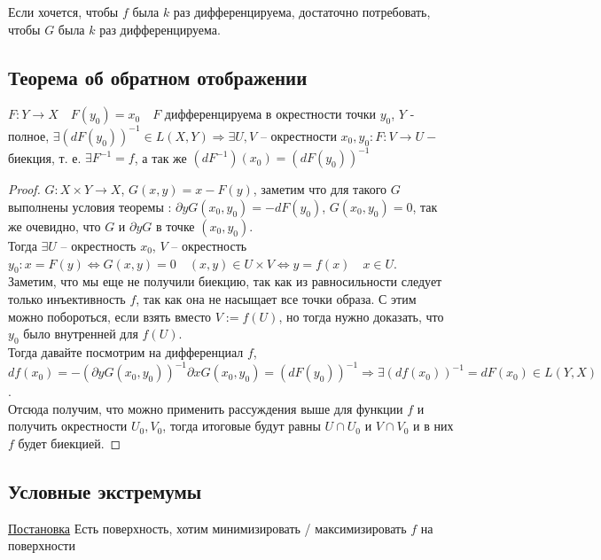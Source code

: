 \follow Если хочется, чтобы $f$ была $k$ раз дифференцируема, достаточно потребовать, чтобы $G$ была $k$ раз дифференцируема.

\subsection{Теорема об обратном отображении}
\begin{theorem}
    $F \colon Y \to X \quad F(y_0) = x_0 \quad F$ дифференцируема в окрестности точки $y_0$, $Y$ - полное, $\exists (d F(y_0))^{-1} \in L(X, Y) \Rightarrow \exists U, V$ -- окрестности $x_0, y_0 \colon F \colon V \to U -$ биекция, т. е. $\exists F^{-1} = f$, а так же $(dF^{-1})(x_0) = (d F(y_0))^{-1}$
\end{theorem}
\begin{proof}
    $G \colon X \times Y \to X$, $G(x, y) = x - F(y)$, заметим что для такого $G$ выполнены условия теоремы : $\partial y G(x_0, y_0) = -d F(y_0)$, $G(x_0, y_0) = 0$, так же очевидно, что $G$ и $\partial y G$ в точке $(x_0, y_0)$.\\
    Тогда $\exists U$ -- окрестность $x_0$, $V$ -- окрестность $y_0 \colon x = F(y) \Leftrightarrow G(x, y) = 0 \quad (x, y) \in U \times V \Leftrightarrow y = f(x) \quad x \in U$.\\
    Заметим, что мы еще не получили биекцию, так как из равносильности следует только инъективность $f$, так как она не насыщает все точки образа. С этим можно побороться, если взять вместо $V := f(U)$, но тогда нужно доказать, что $y_0$ было внутренней для $f(U)$.\\
    Тогда давайте посмотрим на дифференциал $f$, $df(x_0) = -(\partial y G(x_0, y_0))^{-1} \partial x G(x_0, y_0) = (d F(y_0))^{-1} \Rightarrow \exists (d f(x_0))^{-1} = d F(x_0) \in L(Y, X)$.\\
    Отсюда получим, что можно применить рассуждения выше для функции $f$ и получить окрестности $U_0, V_0$, тогда итоговые будут равны $U \cap U_0$ и $V \cap V_0$ и в них $f$ будет биекцией.
\end{proof}

\subsection{Условные экстремумы}

\underline{Постановка} Есть поверхность, хотим минимизировать / максимизировать $f$ на поверхности


